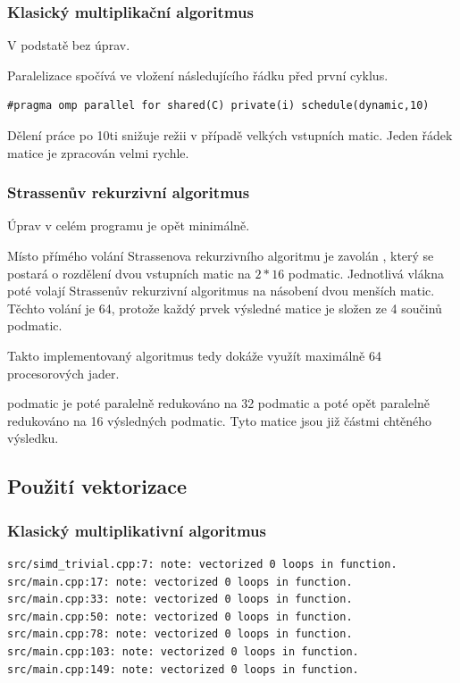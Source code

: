 \documentclass[12pt,a4paper]{article}
\begin{document}
\subsubsection{Klasický multiplikační algoritmus}

V podstatě bez úprav.

\bigskip
Paralelizace spočívá ve vložení následujícího řádku před první cyklus.

\begin{verbatim}
#pragma omp parallel for shared(C) private(i) schedule(dynamic,10)
\end{verbatim}

\bigskip
Dělení práce po 10ti  snižuje režii v případě velkých vstupních matic. Jeden řádek matice je zpracován velmi rychle.


\subsubsection{Strassenův rekurzivní algoritmus}

Úprav v celém programu je opět minimálně.
\bigskip

Místo přímého volání Strassenova rekurzivního algoritmu je zavolán , který se postará o rozdělení dvou vstupních matic na $2*16$ podmatic. Jednotlivá vlákna poté volají Strassenův rekurzivní algoritmus na násobení dvou menších matic. Těchto volání je 64, protože každý prvek výsledné matice je složen ze 4 součinů podmatic.
\bigskip

Takto implementovaný algoritmus tedy dokáže využít maximálně 64 procesorových jader.

 podmatic je poté paralelně redukováno na 32 podmatic a poté opět paralelně redukováno na 16 výsledných podmatic. Tyto matice jsou již částmi chtěného výsledku.


\subsection{Použití vektorizace}

\subsubsection{Klasický multiplikativní algoritmus}

\begin{verbatim}
src/simd_trivial.cpp:7: note: vectorized 0 loops in function.
src/main.cpp:17: note: vectorized 0 loops in function.
src/main.cpp:33: note: vectorized 0 loops in function.
src/main.cpp:50: note: vectorized 0 loops in function.
src/main.cpp:78: note: vectorized 0 loops in function.
src/main.cpp:103: note: vectorized 0 loops in function.
src/main.cpp:149: note: vectorized 0 loops in function.
\end{verbatim}
\end{document}
